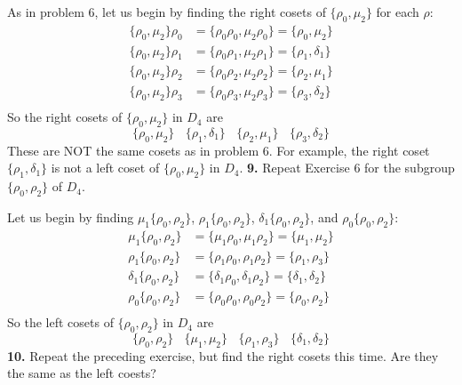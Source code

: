 \documentclass{article}
\begin{document}
As in problem 6, let us begin by finding the right cosets of $\{\rho_0, \mu_2\}$ for each $\rho$:
\begin{align*}
    \{\rho_0, \mu_2\}\rho_0 &= \{\rho_0\rho_0, \mu_2\rho_0\} = \{\rho_0, \mu_2\} \\
    \{\rho_0, \mu_2\}\rho_1 &= \{\rho_0\rho_1, \mu_2\rho_1\} = \{\rho_1, \delta_1\} \\
    \{\rho_0, \mu_2\}\rho_2 &= \{\rho_0\rho_2, \mu_2\rho_2\} = \{\rho_2, \mu_1\} \\
    \{\rho_0, \mu_2\}\rho_3 &= \{\rho_0\rho_3, \mu_2\rho_3\} = \{\rho_3, \delta_2\} \\
\end{align*}
So the right cosets of $\{\rho_0, \mu_2\}$ in $D_4$ are 
\[\{\rho_0, \mu_2\} \:\:\:\: \{\rho_1, \delta_1\} \:\:\:\: \{\rho_2, \mu_1\} \:\:\:\: \{\rho_3, \delta_2\}\]
These are NOT the same cosets as in problem 6. For example, the right coset $\{\rho_1, \delta_1\}$ is not a left coset of $\{\rho_0, \mu_2\}$ in $D_4$.
\newline\newline
\textbf{9.} Repeat Exercise 6 for the subgroup $\{\rho_0, \rho_2\}$ of $D_4$. 
\newline

Let us begin by finding $\mu_1\{\rho_0, \rho_2\}$, $\rho_1\{\rho_0, \rho_2\}$, $\delta_1\{\rho_0, \rho_2\}$, and $\rho_0\{\rho_0, \rho_2\}$:
\begin{align*}
    \mu_1\{\rho_0, \rho_2\} &= \{\mu_1\rho_0, \mu_1\rho_2\} = \{\mu_1, \mu_2\} \\
    \rho_1\{\rho_0, \rho_2\} &= \{\rho_1\rho_0, \rho_1\rho_2\} = \{\rho_1, \rho_3\} \\
    \delta_1\{\rho_0, \rho_2\} &= \{\delta_1\rho_0, \delta_1\rho_2\} = \{\delta_1, \delta_2\} \\
    \rho_0\{\rho_0, \rho_2\} &= \{\rho_0\rho_0, \rho_0\rho_2\} = \{\rho_0, \rho_2\} \\
\end{align*}
So the left cosets of $\{\rho_0, \rho_2\}$ in $D_4$ are 
\[\{\rho_0, \rho_2\} \:\:\:\: \{\mu_1, \mu_2\} \:\:\:\: \{\rho_1, \rho_3\} \:\:\:\: \{\delta_1, \delta_2\}\]
\newline\newline
\textbf{10.} Repeat the preceding exercise, but find the right cosets this time. Are they the same as the left coests?
\newline
\end{document}
